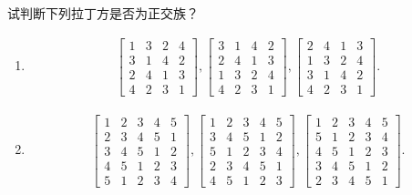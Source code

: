 试判断下列拉丁方是否为正交族？
\begin{enumerate}
    \item \begin{align*}
        \left[\begin{matrix}
            1&3&2&4\\
            3&1&4&2\\
            2&4&1&3\\
            4&2&3&1
        \end{matrix}\right],
        \left[\begin{matrix}
            3&1&4&2\\
            2&4&1&3\\
            1&3&2&4\\
            4&2&3&1
        \end{matrix}\right],
        \left[\begin{matrix}
            2&4&1&3\\
            1&3&2&4\\
            3&1&4&2\\
            4&2&3&1
        \end{matrix}\right].
    \end{align*}
    \item 
    \begin{align*}
        \left[\begin{matrix}
            1&2&3&4&5\\
            2&3&4&5&1\\
            3&4&5&1&2\\
            4&5&1&2&3\\
            5&1&2&3&4
        \end{matrix}\right],
        \left[\begin{matrix}
            1&2&3&4&5\\
            3&4&5&1&2\\
            5&1&2&3&4\\
            2&3&4&5&1\\
            4&5&1&2&3
        \end{matrix}\right],
        \left[\begin{matrix}
            1&2&3&4&5\\
            5&1&2&3&4\\
            4&5&1&2&3\\
            3&4&5&1&2\\
            2&3&4&5&1
        \end{matrix}\right].
    \end{align*}
\end{enumerate}